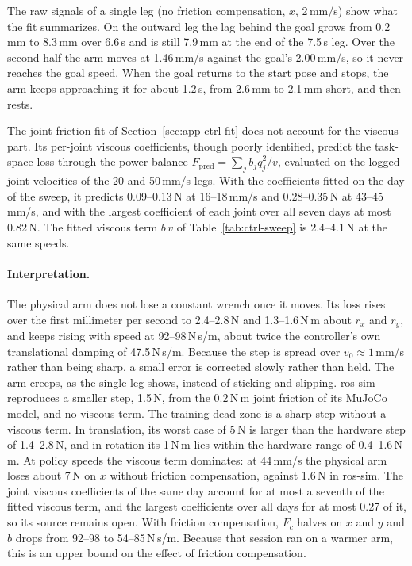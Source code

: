 The raw signals of a single leg (no friction compensation, $x$, 2\,mm/s) show what the fit summarizes. On the outward leg the lag behind the goal grows from 0.2\,mm to 8.3\,mm over 6.6\,s and is still 7.9\,mm at the end of the 7.5\,s leg. Over the second half the arm moves at 1.46\,mm/s against the goal's 2.00\,mm/s, so it never reaches the goal speed. When the goal returns to the start pose and stops, the arm keeps approaching it for about 1.2\,s, from 2.6\,mm to 2.1\,mm short, and then rests.

The joint friction fit of Section~\ref{sec:app-ctrl-fit} does not account for the viscous part. Its per-joint viscous coefficients, though poorly identified, predict the task-space loss through the power balance $F_{\mathrm{pred}}=\sum_j b_j\dot{q}_j^2/v$, evaluated on the logged joint velocities of the 20 and 50\,mm/s legs. With the coefficients fitted on the day of the sweep, it predicts 0.09--0.13\,N at 16--18\,mm/s and 0.28--0.35\,N at 43--45\,mm/s, and with the largest coefficient of each joint over all seven days at most 0.82\,N. The fitted viscous term $b\,v$ of Table~\ref{tab:ctrl-sweep} is 2.4--4.1\,N at the same speeds.

\paragraph{Interpretation.} The physical arm does not lose a constant wrench once it moves. Its loss rises over the first millimeter per second to 2.4--2.8\,N and 1.3--1.6\,N\,m about $r_x$ and $r_y$, and keeps rising with speed at 92--98\,N\,s/m, about twice the controller's own translational damping of 47.5\,N\,s/m. Because the step is spread over $v_0\approx1$\,mm/s rather than being sharp, a small error is corrected slowly rather than held. The arm creeps, as the single leg shows, instead of sticking and slipping. ros-sim reproduces a smaller step, 1.5\,N, from the 0.2\,N\,m joint friction of its MuJoCo model, and no viscous term. The training dead zone is a sharp step without a viscous term. In translation, its worst case of 5\,N is larger than the hardware step of 1.4--2.8\,N, and in rotation its 1\,N\,m lies within the hardware range of 0.4--1.6\,N\,m. At policy speeds the viscous term dominates: at 44\,mm/s the physical arm loses about 7\,N on $x$ without friction compensation, against 1.6\,N in ros-sim. The joint viscous coefficients of the same day account for at most a seventh of the fitted viscous term, and the largest coefficients over all days for at most 0.27 of it, so its source remains open. With friction compensation, $F_c$ halves on $x$ and $y$ and $b$ drops from 92--98 to 54--85\,N\,s/m. Because that session ran on a warmer arm, this is an upper bound on the effect of friction compensation.

